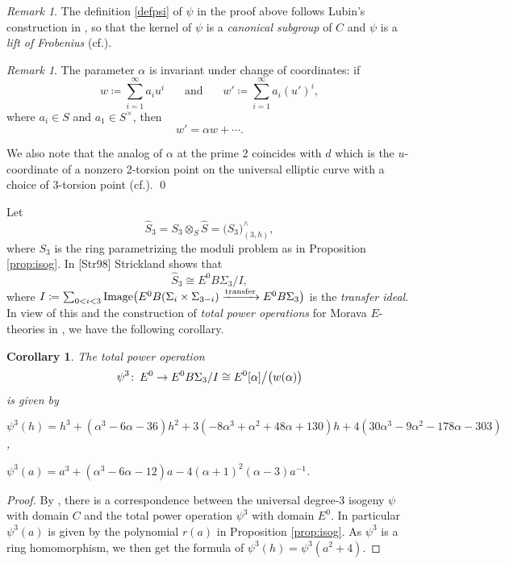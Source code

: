 \documentclass{gtpart}
\newtheorem{cor}[thm]{Corollary}
\theoremstyle{definition}
\theoremstyle{remark}
\newtheorem{rmk}[thm]{Remark}
\def\co{\colon\thinspace}
\newcommand{\cf}[1]{cf.\thinspace{\cite{#1}}}
\newcommand{\cff}[2]{cf.\thinspace{\cite[#1]{#2}}}
\newcommand{\HS}{\widehat{S}}
\newcommand{\A}{\alpha}
\newcommand{\p}{\psi^3}
\begin{document}
\begin{rmk}
\label{rmk:lubin}
 The definition \eqref{defpsi} of $\psi$ in the proof above follows Lubin's construction in \cite[proof of Theorem 1.4]{lubin67}, 
 so that the kernel of $\psi$ is a {\em canonical subgroup} of $C$ and $\psi$ is a {\em lift of Frobenius} (\cf{lubin79}).
\end{rmk}

\begin{rmk}
\label{rmk:alpha}
 The parameter $\A$ is invariant under change of coordinates: if 
 \[
  w \coloneqq \sum_{i = 1}^\infty a_i u^i~~~~~~~~\text{and}~~~~~~~~w' \coloneqq \sum_{i = 1}^\infty a_i (u')^i, 
 \]
 where $a_i \in S$ and $a_1 \in S^\times$, then 
 \[
  w' = \A w + \cdots.  
 \]

 We also note that the analog of $\A$ at the prime 2 coincides with $d$ 
 which is the $u$-coordinate of a nonzero 2-torsion point on the universal elliptic curve with a choice of 3-torsion point (\cff{Section 3}{h2p2}).  
\qed
\end{rmk}

Let 
\begin{equation}
\label{S3hat}
 \HS_3 = S_3 \otimes_S \HS = \big( S_3 \big)_{(3,h)}^\wedge, 
\end{equation}
where $S_3$ is the ring parametrizing the moduli problem as in Proposition \ref{prop:isog}.  In [Str98] Strickland shows that 
\[
 \HS_3 \cong E^0 B\Sigma_3 / I, 
\]
where $I \coloneqq \sum_{0<i<3} {\rm Image} \big( E^0 B(\Sigma_i \times \Sigma_{3-i}) \xrightarrow{\rm transfer} E^0 B\Sigma_3 \big)$ is the {\em transfer ideal}.  
In view of this and the construction of {\em total power operations} for Morava $E$-theories in \cite[3.23]{cong}, we have the following corollary.  

\begin{cor}
\label{cor:psi3}
 The total power operation 
 \[
  \p \co E^0 \to E^0 B\Sigma_3 / I \cong E^0 [\A] \big/ \big( w(\A) \big) 
 \]
 is given by 
 
 $\p(h) = h^3 + (\A^3 - 6 \A - 36) h^2 + 3 (-8 \A^3 + \A^2 + 48 \A + 130) h + 4 (30 \A^3 - 9 \A^2 - 178 \A - 303)$, 
 
 $\p(a) = a^3 + (\A^3 - 6 \A - 12) a - 4 (\A + 1)^2 (\A - 3) a^{-1}$.  
 
\end{cor}
\begin{proof}
 By \cite[Theorem B]{cong}, there is a correspondence between the universal degree-3 isogeny $\psi$ with domain $C$ 
 and the total power operation $\p$ with domain $E^0$.  In particular $\p(a)$ is given by the polynomial $r(a)$ in Proposition \ref{prop:isog}.  
 As $\p$ is a ring homomorphism, we then get the formula of $\p(h) = \p(a^2 + 4)$.  
\end{proof}
\end{document}
